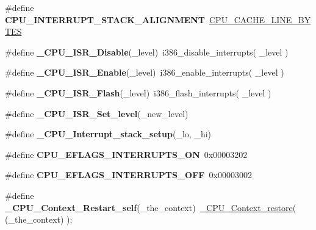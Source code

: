 \begin{DoxyCompactItemize}
\item 
\mbox{\label{group__RTEMSScoreCPUi386_ga6a578627686e1020a28f5a295703ca74}} 
\#define {\bfseries C\+P\+U\+\_\+\+I\+N\+T\+E\+R\+R\+U\+P\+T\+\_\+\+S\+T\+A\+C\+K\+\_\+\+A\+L\+I\+G\+N\+M\+E\+NT}~\mbox{\hyperlink{no__cpu_2include_2rtems_2score_2cpu_8h_aafa1399e268a9ae6adf6d6aad4371688}{C\+P\+U\+\_\+\+C\+A\+C\+H\+E\+\_\+\+L\+I\+N\+E\+\_\+\+B\+Y\+T\+ES}}
\item 
\mbox{\label{group__RTEMSScoreCPUi386_gabc05c31eff429870b8564553d9eae054}} 
\#define {\bfseries \+\_\+\+C\+P\+U\+\_\+\+I\+S\+R\+\_\+\+Disable}(\+\_\+level)~i386\+\_\+disable\+\_\+interrupts( \+\_\+level )
\item 
\mbox{\label{group__RTEMSScoreCPUi386_ga01f5da058924ecbc4c84ceb8613145a0}} 
\#define {\bfseries \+\_\+\+C\+P\+U\+\_\+\+I\+S\+R\+\_\+\+Enable}(\+\_\+level)~i386\+\_\+enable\+\_\+interrupts( \+\_\+level )
\item 
\mbox{\label{group__RTEMSScoreCPUi386_gab06bc7d1751ca97bbe1f4c50d14c4453}} 
\#define {\bfseries \+\_\+\+C\+P\+U\+\_\+\+I\+S\+R\+\_\+\+Flash}(\+\_\+level)~i386\+\_\+flash\+\_\+interrupts( \+\_\+level )
\item 
\#define {\bfseries \+\_\+\+C\+P\+U\+\_\+\+I\+S\+R\+\_\+\+Set\+\_\+level}(\+\_\+new\+\_\+level)
\item 
\#define {\bfseries \+\_\+\+C\+P\+U\+\_\+\+Interrupt\+\_\+stack\+\_\+setup}(\+\_\+lo,  \+\_\+hi)
\item 
\mbox{\label{group__RTEMSScoreCPUi386_gaac2f0f65942a9e8b312f98c6439ab30a}} 
\#define {\bfseries C\+P\+U\+\_\+\+E\+F\+L\+A\+G\+S\+\_\+\+I\+N\+T\+E\+R\+R\+U\+P\+T\+S\+\_\+\+ON}~0x00003202
\item 
\mbox{\label{group__RTEMSScoreCPUi386_gaf2b697efdda65714d2d44a95ddfdf68f}} 
\#define {\bfseries C\+P\+U\+\_\+\+E\+F\+L\+A\+G\+S\+\_\+\+I\+N\+T\+E\+R\+R\+U\+P\+T\+S\+\_\+\+O\+FF}~0x00003002
\item 
\mbox{\label{group__RTEMSScoreCPUi386_ga3fb67e174d7b61251322cd32126acd1a}} 
\#define {\bfseries \+\_\+\+C\+P\+U\+\_\+\+Context\+\_\+\+Restart\+\_\+self}(\+\_\+the\+\_\+context)~\mbox{\hyperlink{group__RTEMSScoreCPUARM_ga80726ebfe00f31a88b086cc4474c472f}{\+\_\+\+C\+P\+U\+\_\+\+Context\+\_\+restore}}( (\+\_\+the\+\_\+context) );

\end{DoxyCompactItemize}
